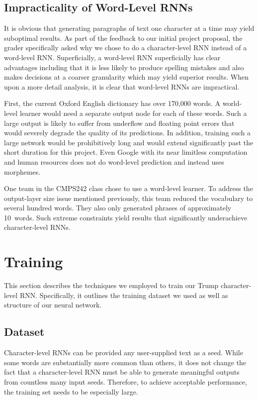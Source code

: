 \documentclass{article}
\begin{document}
\subsection{Impracticality of Word-Level RNNs}\label{sec:wordLevelRnn}

It is obvious that generating paragraphs of text one character at a time may yield suboptimal results.  As part of the feedback to our initial project proposal, the grader specifically asked why we chose to do a character-level RNN instead of a word-level RNN.  Superficially, a word-level RNN superficially has clear advantages including that it is less likely to produce spelling mistakes and also makes decisions at a coarser granularity which may yield superior results.  When upon a more detail analysis, it is clear that word-level RNNs are impractical.

First, the current Oxford English dictionary has over 170,000 words. A world-level learner would need a separate output node for each of these words.  Such a large output is likely to suffer from underflow and floating point errors that would severely degrade the quality of its predictions.  In addition, training such a large network would be prohibitively long and would extend significantly past the short duration for this project.  Even Google with its near limitless computation and human resources does not do word-level prediction and instead uses morphemes.

One team in the CMPS242 class chose to use a word-level learner.  To address the output-layer size issue mentioned previously, this team reduced the vocabulary to several hundred words.  They also only generated phrases of approximately 10~words.  Such extreme constraints yield results that significantly underachieve character-level RNNs.

\section{Training}\label{sec:training}

This section describes the techniques we employed to train our Trump character-level RNN.  Specifically, it outlines the training dataset we used as well as structure of our neural network.

\subsection{Dataset}

Character-level RNNs can be provided any user-supplied text as a seed.  While some words are substantially more common than others, it does not change the fact that a character-level RNN must be able to generate meaningful outputs from countless many input seeds. Therefore, to achieve acceptable performance, the training set needs to be especially large.
\end{document}
